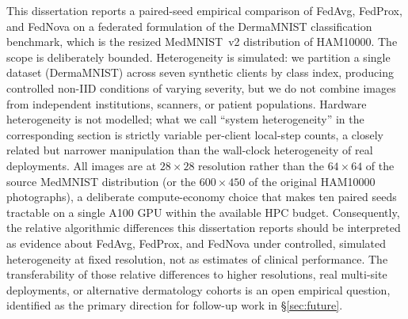 \documentclass[11pt,a4paper]{article}
\begin{document}
This dissertation reports a paired-seed empirical comparison of
FedAvg, FedProx, and FedNova on a federated formulation of the
DermaMNIST classification benchmark, which is the resized
MedMNIST~v2 distribution of HAM10000. The scope is deliberately
bounded. Heterogeneity is simulated: we partition a single dataset
(DermaMNIST) across seven synthetic clients by class index, producing
controlled non-IID conditions of varying severity, but we do not
combine images from independent institutions, scanners, or patient
populations. Hardware heterogeneity is not modelled; what we call
``system heterogeneity'' in the corresponding section is strictly
variable per-client local-step counts, a closely related but
narrower manipulation than the wall-clock heterogeneity of real
deployments. All images are at $28 \times 28$ resolution rather
than the $64 \times 64$ of the source MedMNIST distribution (or the
$600 \times 450$ of the original HAM10000 photographs), a deliberate
compute-economy choice that makes ten paired seeds tractable on a
single A100 GPU within the available HPC budget. Consequently, the
relative algorithmic differences this dissertation reports should be
interpreted as evidence about FedAvg, FedProx, and FedNova under
controlled, simulated heterogeneity at fixed resolution, not as
estimates of clinical performance. The transferability of those
relative differences to higher resolutions, real multi-site
deployments, or alternative dermatology cohorts is an open empirical
question, identified as the primary direction for follow-up work in
\S\ref{sec:future}.
\end{document}
